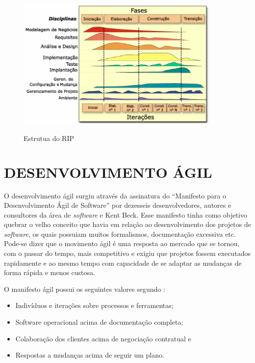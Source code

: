\begin{figure}[htb!]
\begin{center}
\caption{Estrutua do RIP}
\label{fig:rup}
\includegraphics[width=10cm]{assets/rup} \\
\end{center}
\end{figure}

\section{DESENVOLVIMENTO ÁGIL}
\label{sec:agile}
O desenvolvimento ágil surgiu através da assinatura do ``Manifesto para o Desenvolvimento Ágil de Software'' por dezesseis desenvolvedores, autores e consultores da área de \textit{software} e Kent Beck. Esse manifesto tinha como objetivo quebrar o velho conceito que havia em relação ao desenvolvimento dos projetos de \textit{software}, os quais possuiam muitos formalismos, documentação excessiva etc. Pode-se dizer que o movimento ágil é uma resposta ao mercado que se tornou, com o passar do tempo, mais competitivo e exigiu que projetos fossem executados rapidamente e ao mesmo tempo com capacidade de se adaptar as mudanças de forma rápida e menos custosa. \cite{pressman:11} 

O manifesto ágil possui os seguintes valores segundo :

\begin{citacao}
\begin{itemize}
	\item Indivíduos e iterações sobre processos e ferramentas;
	\item Software operacional acima de documentação completa;
	\item Colaboração dos clientes acima de negociação contratual e
	\item Respostas a mudanças acima de seguir um plano.
\end{itemize}
\end{citacao}

